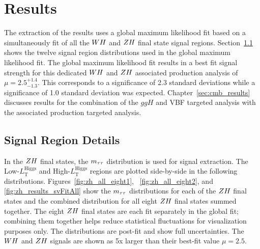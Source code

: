 \section{Results}
\label{sec:vh_results}

The extraction of the results uses a global maximum likelihood fit based on a 
simultaneously fit of all the $WH$ and $ZH$ final state signal regions. 
Section~\ref{sec:vh_sr} shows the twelve signal region distributions
used in the global maximum likelihood fit. 
The global maximum likelihood fit results in a best fit signal
strength for this dedicated $WH$ and $ZH$ associated production analysis of
$\mu = 2.5 ^{+1.4} _{-1.3}$. This corresponds to 
a significance of 2.3 standard deviations while a significance of 1.0 standard deviation was expected.
Chapter~\ref{sec:cmb_results} discusses results for the combination of the
$ggH$ and VBF targeted analysis with the associated production targeted
analysis.

\subsection{Signal Region Details}
\label{sec:vh_sr}

In the $ZH$ final states, the $m_{\tau\tau}$ distribution is
used for signal extraction. The Low-$L_{\text{T}}^{\textrm{Higgs}}$ and
High-$L_{\text{T}}^{\textrm{Higgs}}$ regions are plotted side-by-side
in the following distributions. Figures~\ref{fig:zh_all_eight1}, ~\ref{fig:zh_all_eight2}, 
and \ref{fig:zh_results_svFitAll} show the $m_{\tau\tau}$ distributions 
for each of the $ZH$ final states and the combined distribution for 
all eight $ZH$ final states summed together. The eight $ZH$ final states are each 
fit separately in the global fit; combining them together helps reduce statistical
fluctuations for visualization purposes only.
The distributions are post-fit and show full uncertainties.
The $WH$ and $ZH$ signals are shown as 5x larger than their best-fit
value $\mu = 2.5$.

